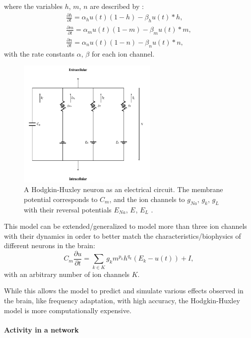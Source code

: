 where the variables $h$, $m$, $n$  are described by :
\[
\begin{split}
	\frac{\partial h}{\partial t} = \alpha_h u(t) (1-h) - \beta_h u(t) * h , \\
	\frac{\partial m}{\partial t} = \alpha_m u(t) (1-m) - \beta_m u(t) * m , \\
	\frac{\partial n}{\partial t} = \alpha_n u(t) (1-n) - \beta_n u(t) * n ,
\end{split}
\]
with the rate constants $\alpha$, $\beta$ for each ion channel.

\begin{figure}
	\centering
    	\includegraphics[width=0.6\textwidth]{imgs/hode_hux.png} 
    \caption[A Hodgkin-Huxley neuron as an electrical circuit.]{A Hodgkin-Huxley neuron as an electrical circuit. The membrane potential corresponds to $C_m$, and the ion channels to $g_{Na}$, $g_{k}$, $g_{L}$ with their reversal potentials $E_{Na}$, $E_{}$, $E_{L}$ \cite{heikoMA}.}
	\label{fig:hogdehux}
\end{figure}

This model can be extended/generalized to model more than three ion channels with their dynamics in order to better match the characteristics/biophysics of different neurons in the brain:
\[
C_m \frac{\partial u}{\partial t} = \sum_{k \in K} g_k m^{p_k} h^{q_k} (E_k - u(t)) + I,
\]
with an arbitrary number of ion channels $K$.

While this allows the model to predict and simulate various effects observed in the brain, like frequency adaptation, with high accuracy, the Hodgkin-Huxley model is more computationally expensive.

\paragraph{Activity in a network} \label{c:poissonspikes}

